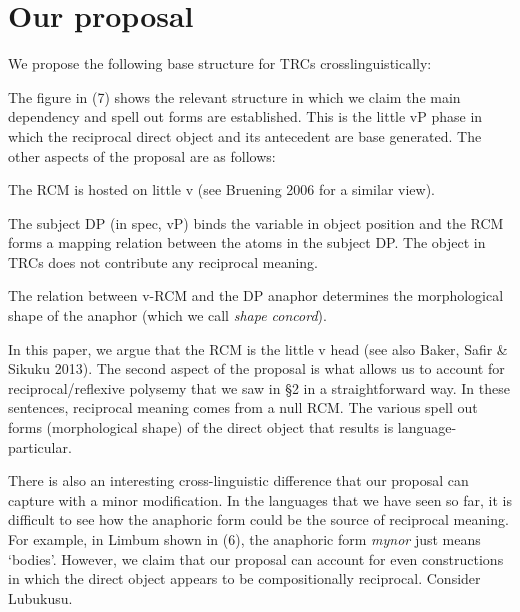 \documentclass[output=paper]{langsci/langscibook}
\begin{document}
\chapter{Our proposal }

We propose the following base structure for TRCs crosslinguistically:

 
\setcounter{listWWviiiNumxlileveli}{0}
\begin{listWWviiiNumxlileveli}
\item \end{listWWviiiNumxlileveli}
\setcounter{listWWviiiNumxixleveli}{0}
\begin{listWWviiiNumxixleveli}
\begin{styleExample}
The figure in (7) shows the relevant structure in which we claim the main dependency and spell out forms are established. This is the little vP phase in which the reciprocal direct object and its antecedent are base generated. The other aspects of the proposal are as follows:
\end{styleExample}
\end{listWWviiiNumxixleveli}
\begin{listWWviiiNumxxxviiileveli}
\item The RCM is hosted on little v (see Bruening 2006 for a similar view).

\item The subject DP (in spec, vP) binds the variable in object position and the RCM forms a mapping relation between the atoms in the subject DP.\textbf{ }The object in TRCs does not contribute any reciprocal meaning.

\item The relation between v-RCM and the DP anaphor determines the morphological shape of the anaphor (which we call \textit{shape concord}).

\end{listWWviiiNumxxxviiileveli}

In this paper, we argue that the RCM is the little v head (see also Baker, Safir \& Sikuku 2013). The second aspect of the proposal is what allows us to account for reciprocal/reflexive polysemy that we saw in §2 in a straightforward way. In these sentences, reciprocal meaning comes from a null RCM. The various spell out forms (morphological shape) of the direct object that results is language-particular. 

  There is also an interesting cross-linguistic difference that our proposal can capture with a minor modification. In the languages that we have seen so far, it is difficult to see how the anaphoric form could be the source of reciprocal meaning. For example, in Limbum shown in (6), the anaphoric form \textit{mynor} just means ‘bodies’. However, we claim that our proposal can account for even constructions in which the direct object appears to be compositionally reciprocal. Consider Lubukusu.
\end{document}
